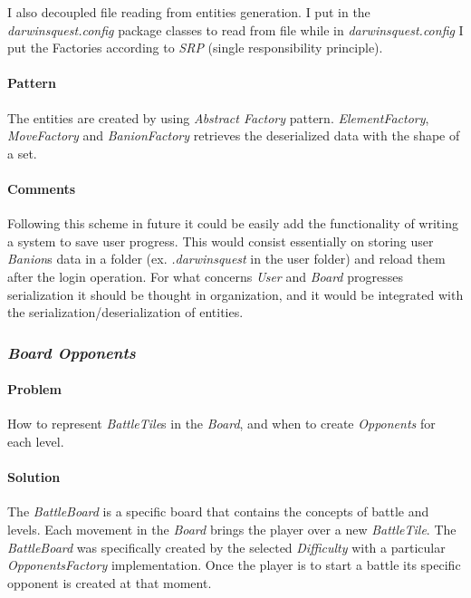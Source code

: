 \documentclass[12pt, a4paper]{report}
\theoremstyle{definition}
\begin{document}
            I also decoupled file reading from entities generation.
            I put in the \textit{darwinsquest.config} package classes to read from file while in \textit{darwinsquest.config} I put the Factories according to \emph{SRP} (single responsibility principle).

            \paragraph{Pattern}

            The entities are created by using \emph{Abstract Factory} pattern.
            \emph{ElementFactory}, \emph{MoveFactory} and \emph{BanionFactory} retrieves the deserialized data with the shape of a set.

            \paragraph{Comments}

            Following this scheme in future it could be easily add the functionality of writing a system to save user progress.
            This would consist essentially on storing user \emph{Banion}s data in a folder (ex. \emph{.darwinsquest} in the user folder) and reload them after the login operation.
            For what concerns \emph{User} and \emph{Board} progresses serialization it should be thought in organization, and it would be integrated with the serialization/deserialization of entities.

        \pagebreak

        \subsubsection{\emph{Board Opponents}}

            \paragraph{Problem}

            How to represent \emph{BattleTile}s in the \emph{Board}, and when to create \emph{Opponents} for each level.

            \paragraph{Solution}

            The \emph{BattleBoard} is a specific board that contains the concepts of battle and levels.
            Each movement in the \emph{Board} brings the player over a new \emph{BattleTile}.
            The \emph{BattleBoard} was specifically created by the selected \emph{Difficulty} with a particular \emph{OpponentsFactory} implementation.
            Once the player is to start a battle its specific opponent is created at that moment.
\end{document}
